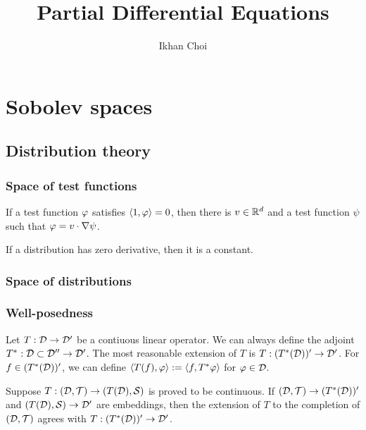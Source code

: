 \documentclass{../../large}
\begin{document}
\title{Partial Differential Equations}
\author{Ikhan Choi}
\maketitle
\tableofcontents


\part{Sobolev spaces}

\chapter{Distribution theory}
\section{Space of test functions}
\begin{prb}
\begin{parts}
\item If a test function $\varphi$ satisfies $\langle1,\varphi\rangle=0$, then there is $v\in\mathbb{R}^d$ and a test function $\psi$ such that $\varphi=v\cdot\nabla\psi$.
\item If a distribution has zero derivative, then it is a constant.
\end{parts}
\end{prb}
\begin{prb}
\end{prb}

\section{Space of distributions}
\begin{prb}

\end{prb}


\section{Well-posedness}

\begin{prb}
Let $T:\mathcal{D}\to\mathcal{D}'$ be a contiuous linear operator.
We can always define the adjoint $T^*:\mathcal{D}\subset\mathcal{D}''\to\mathcal{D}'$.
The most reasonable extension of $T$ is $T:(T^*(\mathcal{D}))'\to\mathcal{D}'$.
For $f\in(T^*(\mathcal{D}))'$, we can define $\langle T(f),\varphi\rangle:=\langle f,T^*\varphi\rangle$ for $\varphi\in\mathcal{D}$.

Suppose $T:(\mathcal{D},\mathcal{T})\to(T(\mathcal{D}),\mathcal{S})$ is proved to be continuous.
If $(\mathcal{D},\mathcal{T})\to(T^*(\mathcal{D}))'$ and $(T(\mathcal{D}),\mathcal{S})\to\mathcal{D}'$ are embeddings, then the extension of $T$ to the completion of $(\mathcal{D},\mathcal{T})$ agrees with $T:(T^*(\mathcal{D}))'\to\mathcal{D}'$.
\end{prb}
\end{document}
